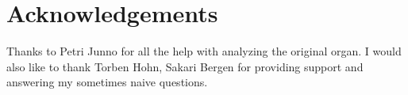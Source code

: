 \documentclass[11pt,a4paper]{article}
\begin{document}


\section{Acknowledgements}

Thanks to Petri Junno for all the help with analyzing the original organ. I would also like to thank Torben Hohn, Sakari Bergen for providing support and answering my sometimes naive questions. %




\end{document}
